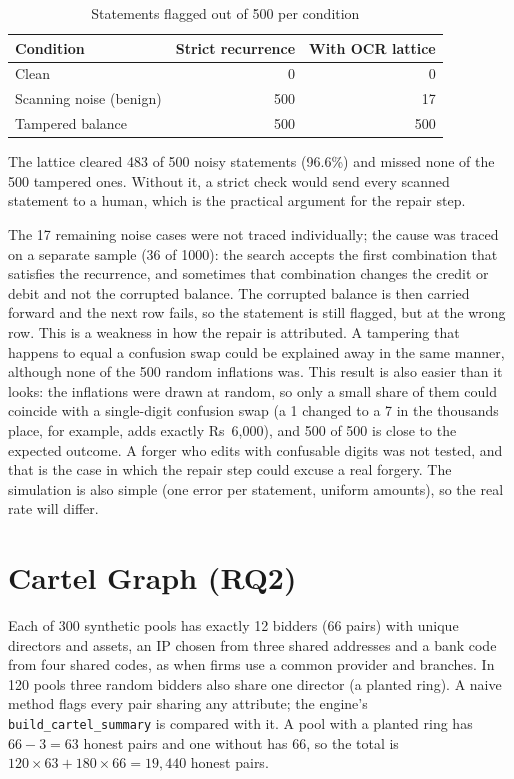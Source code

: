 \begin{table}[htbp]
\centering
\caption{Statements flagged out of 500 per condition}
\label{tab:ledger}
\small
\begin{tabular}{@{}lrr@{}}
\toprule
\textbf{Condition} & \textbf{Strict recurrence} & \textbf{With OCR lattice} \\
\midrule
Clean & 0 & 0 \\
Scanning noise (benign) & 500 & 17 \\
Tampered balance & 500 & 500 \\
\bottomrule
\end{tabular}
\end{table}

The lattice cleared 483 of 500 noisy statements (96.6\%) and missed none of the 500 tampered ones. Without it, a strict check would send every scanned statement to a human, which is the practical argument for the repair step.

The 17 remaining noise cases were not traced individually; the cause was traced on a separate sample (36 of 1000): the search accepts the first combination that satisfies the recurrence, and sometimes that combination changes the credit or debit and not the corrupted balance. The corrupted balance is then carried forward and the next row fails, so the statement is still flagged, but at the wrong row. This is a weakness in how the repair is attributed. A tampering that happens to equal a confusion swap could be explained away in the same manner, although none of the 500 random inflations was. This result is also easier than it looks: the inflations were drawn at random, so only a small share of them could coincide with a single-digit confusion swap (a 1 changed to a 7 in the thousands place, for example, adds exactly Rs~6{,}000), and 500 of 500 is close to the expected outcome. A forger who edits with confusable digits was not tested, and that is the case in which the repair step could excuse a real forgery. The simulation is also simple (one error per statement, uniform amounts), so the real rate will differ.

\section{Cartel Graph (RQ2)}
Each of 300 synthetic pools has exactly 12 bidders (66 pairs) with unique directors and assets, an IP chosen from three shared addresses and a bank code from four shared codes, as when firms use a common provider and branches. In 120 pools three random bidders also share one director (a planted ring). A naive method flags every pair sharing any attribute; the engine's \texttt{build\_cartel\_summary} is compared with it. A pool with a planted ring has $66-3=63$ honest pairs and one without has 66, so the total is $120\times63+180\times66=19{,}440$ honest pairs.

